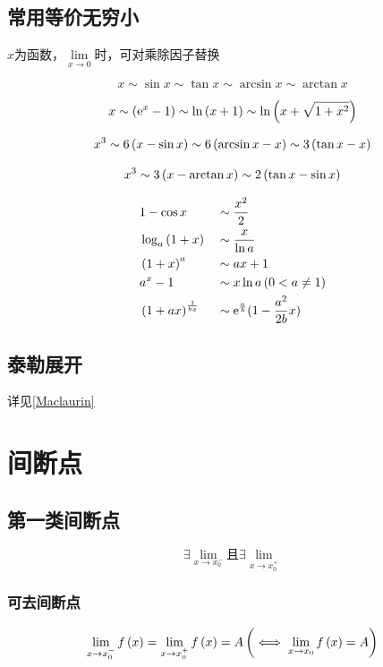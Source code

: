 \documentclass{article}
\begin{document}
\subsection{常用等价无穷小}

$x$为函数，$\lim\limits_{x\to0}$时，可对乘除因子替换

\[x\sim\sin x\sim\tan x\sim\arcsin x\sim\arctan x\]

\[x\sim\left(\mathrm e^x-1\right)\sim\ln\left(x+1\right)\sim\ln\left(x+\sqrt{1+x^2}\right)\]

\[x^3\sim6\left(x-\sin x\right)\sim6\left(\arcsin x-x\right)\sim3\left(\tan x-x\right)\]

\[x^3\sim3\left(x-\arctan x\right)\sim2\left(\tan x -\sin x\right)\]

\[\begin{aligned}
         & 1-\cos x            &  & \sim\frac{x^2}2                    \\
         & \log_a{\left(1+x\right)}     &  & \sim\frac x{\ln a}                 \\
         & \left(1+x\right)^a           &  & \sim ax+1                          \\
         & a^x-1               &  & \sim x\ln a\left(0<a\neq1\right)            \\
         & \left(1+ax\right)^\frac1{bx} &  & \sim\mathrm e^\frac ab(1-\frac{a^2}{2b}x) \\
    \end{aligned}\]

\subsection{泰勒展开}

详见\ref{Maclaurin}

\section{间断点}

\subsection{第一类间断点}

\[\exists\lim_{x\to x_0^-}\text{且}\exists\lim_{x\to x_0^+}\]

\subsubsection{可去间断点}

\[\lim_{x\to x_0^-}f\left(x\right)=\lim_{x\to x_0^+}f\left(x\right)=A\left(\iff\lim_{x\to x_0}f\left(x\right)=A\right)\]
\end{document}
